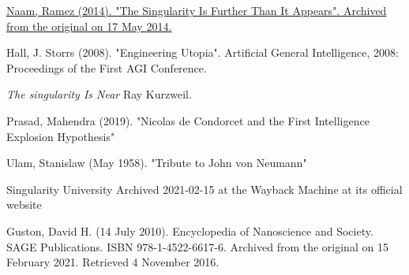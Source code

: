 \documentclass[a4paper]{article}
\begin{document}
\begin{thebibliography}{9}
\href{ http://www.antipope.org/charlie/blog-static/2014/02/the-singularity-is-further-tha.html } {Naam, Ramez (2014). "The Singularity Is Further Than It Appears". Archived from the original on 17 May 2014.}

 Hall, J. Storrs (2008). "Engineering Utopia". Artificial General Intelligence, 2008: Proceedings of the First AGI Conference.

 \textit{The singularity Is Near} Ray Kurzweil.

Prasad, Mahendra (2019). "Nicolas de Condorcet and the First Intelligence Explosion Hypothesis"

 Ulam, Stanislaw (May 1958). "Tribute to John von Neumann"

 Singularity University Archived 2021-02-15 at the Wayback Machine at its official website

 Guston, David H. (14 July 2010). Encyclopedia of Nanoscience and Society. SAGE Publications. ISBN 978-1-4522-6617-6. Archived from the original on 15 February 2021. Retrieved 4 November 2016.

\end{thebibliography}
\end{document}
